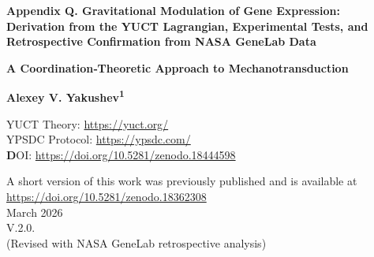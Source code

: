 \documentclass[12pt,a4paper]{article}
\theoremstyle{remark}
\begin{document}
	
	\begin{titlepage}
		\begin{center}
			\vspace*{1cm}
			
			\Huge\textbf{Appendix Q. Gravitational Modulation of Gene Expression: \\ Derivation from the YUCT Lagrangian, Experimental Tests, and Retrospective Confirmation from NASA GeneLab Data}
			
			\vspace{0.5cm}
			\Large\textbf{A Coordination‑Theoretic Approach to Mechanotransduction}
			
			\vspace{1.5cm}
			
			\Large\textbf{Alexey V. Yakushev\textsuperscript{1}}
			
			YUCT Theory: \url{https://yuct.org/}\\
			YPSDC Protocol: \url{https://ypsdc.com/}\\
			
			
			\vspace{2cm}
			\textbf DOI: \url{https://doi.org/10.5281/zenodo.18444598}\\
			
			\vspace{1cm}
			
			\vspace{0cm}
			\large 
			A short version of this work was previously published and is available at\\ \url{https://doi.org/10.5281/zenodo.18362308}\\
			\vspace{1cm}
			March 2026 \\ \large V.2.0.
			\\ (Revised with NASA GeneLab retrospective analysis)
			
			\vspace{2cm}
			

\end{center}
\end{titlepage}
\end{document}
